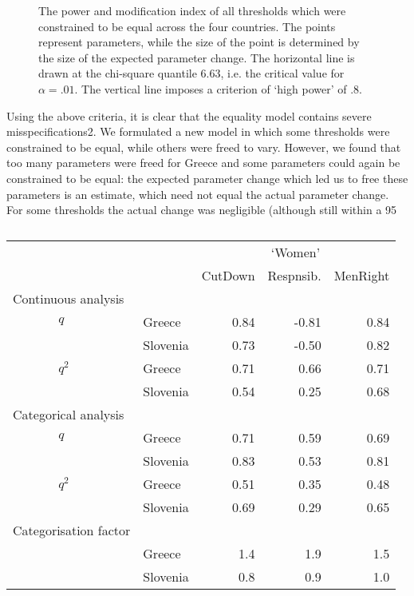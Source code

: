 \documentclass[a4paper,12pt]{article}
\begin{document}
\begin{figure}\caption{The power and modification index of all thresholds which were constrained to be equal across the four countries. The points represent parameters, while the size of the point is determined by the size of the expected parameter change. The horizontal line is drawn at the chi-square quantile 6.63, i.e. the critical value for $\alpha=.01$. The vertical line imposes a criterion of ‘high power’ of .8.\label{fig:modindices}}
\end{figure}

Using the above criteria, it is clear that the equality model contains severe misspecifications2. We formulated a new model in which some thresholds were constrained to be equal, while others were freed to vary. However, we found that too many parameters were freed for Greece and some parameters could again be constrained to be equal: the expected parameter change which led us to free these parameters is an estimate, which need not equal the actual parameter change. For some thresholds the actual change was negligible (although still within a 95%

\begin{table}\centering\caption{\label{tab:women}}\begin{tabular}{lllrrr}
\hline
 &  &  & \multicolumn{3}{c}{`Women'} \\
 &  &  & CutDown & Respnsib. & MenRight\\
\hline
\multicolumn{2}{l}{Continuous analysis}\\
		   & $q$ & Greece & 0.84 & -0.81 & 0.84\\
 &  & Slovenia & 0.73 & -0.50 & 0.82\\
 & $q^2$ & Greece & 0.71 & 0.66 & 0.71\\
 &  & Slovenia & 0.54 & 0.25 & 0.68\\
\multicolumn{2}{l}{Categorical analysis}   &  &  &  & \\
 & $q$ & Greece & 0.71 & 0.59 & 0.69\\
 &  & Slovenia & 0.83 & 0.53 & 0.81\\
 & $q^2$ & Greece & 0.51 & 0.35 & 0.48\\
 &  & Slovenia & 0.69 & 0.29 & 0.65\\
 \multicolumn{2}{l}{Categorisation factor}   &  &  &  & \\
 &  & Greece & 1.4 & 1.9 & 1.5\\
 &  & Slovenia & 0.8 & 0.9 & 1.0\\
\hline
\end{tabular}\end{table}
\end{document}
